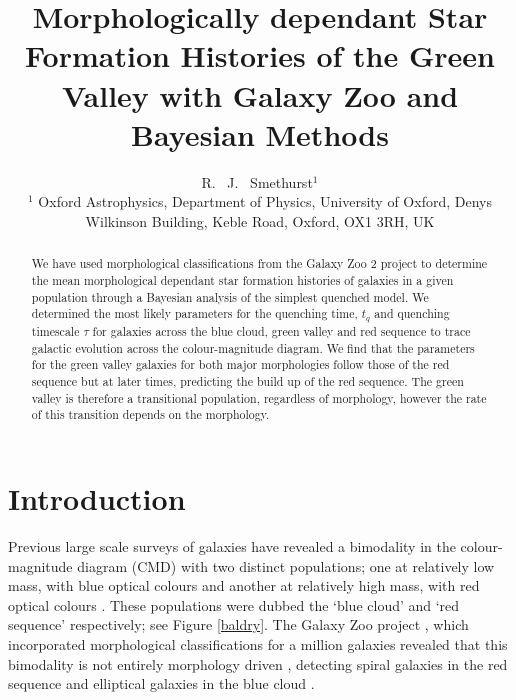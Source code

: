 \documentclass{mn2e}
\begin{document}
\title[Bayesian methods with Galaxy Zoo]{Morphologically dependant Star Formation Histories of the Green Valley with Galaxy Zoo and Bayesian Methods}
\author[Smethurst et al. 2014]{R. ~J. ~Smethurst$^1$
\\ $^1$ Oxford Astrophysics, Department of Physics, University of Oxford, Denys Wilkinson Building, Keble Road, Oxford, OX1 3RH, UK }

\maketitle

\begin{abstract}
We have used morphological classifications from the Galaxy Zoo 2 project to determine the mean morphological dependant star formation histories of galaxies in a given population through a Bayesian analysis of the simplest quenched model. We determined the most likely parameters for the quenching time, $t_q$ and quenching timescale $\tau$ for galaxies across the blue cloud, green valley and red sequence to trace galactic evolution across the colour-magnitude diagram. We find that the parameters for the green valley galaxies for both major morphologies follow those of the red sequence but at later times, predicting the build up of the red sequence. The green valley is therefore a transitional population, regardless of morphology, however the rate of this transition depends on the morphology. 
\end{abstract}

\section{Introduction}
Previous large scale surveys of galaxies have revealed a bimodality in the colour-magnitude diagram (CMD) with two distinct populations; one at relatively low mass, with blue optical colours and another at relatively high mass, with red optical colours \citep{Baldry04, Baldry06, Willmer06, BLB08, Brammer09}. These populations were dubbed the `blue cloud' and `red sequence' respectively; see Figure \ref{baldry}. The Galaxy Zoo project \citep{Lintott11}, which incorporated morphological classifications for a million galaxies revealed that this bimodality is not entirely morphology driven \citep{Bamford09, Skibba09}, detecting spiral galaxies in the red sequence \citep{Masters10} and elliptical galaxies in the blue cloud \citep{Sch09}.  
\end{document}

